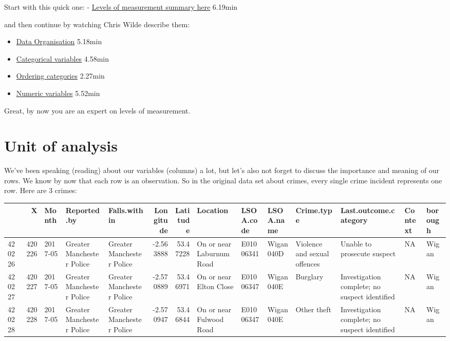 \documentclass[]{book}
\providecommand{\tightlist}{%
  \setlength{\itemsep}{0pt}\setlength{\parskip}{0pt}}
\theoremstyle{definition}
\theoremstyle{definition}
\theoremstyle{definition}
\theoremstyle{remark}
\begin{document}
Start with this quick one: -
\href{https://www.youtube.com/watch?v=hZxnzfnt5v8}{Levels of measurement
summary here} 6.19min

and then continue by watching Chris Wilde describe them:

\begin{itemize}
\tightlist
\item
  \href{https://www.youtube.com/watch?v=_ROBwTFVldo\&list=PL8CRAVedURQpYNoFt7w6maxaQCn3ZLytu\&index=3}{Data
  Organisation} 5.18min
\item
  \href{https://www.youtube.com/watch?v=38oQwFeCEag\&list=PL8CRAVedURQrlxeFfme0TEgaj1_h67JUR\&index=2}{Categorical
  variables} 4.58min
\item
  \href{https://www.youtube.com/watch?v=xmRuRRHsUeg\&index=3\&list=PL8CRAVedURQrlxeFfme0TEgaj1_h67JUR}{Ordering
  categories} 2.27min
\item
  \href{https://www.youtube.com/watch?v=U3lk2nQYfAQ\&list=PL8CRAVedURQrlxeFfme0TEgaj1_h67JUR\&index=4}{Numeric
  variables} 5.52min
\end{itemize}

Great, by now you are an expert on levels of measurement.

\hypertarget{unit-of-analysis}{%
\section{Unit of analysis}\label{unit-of-analysis}}

We've been speaking (reading) about our variables (columns) a lot, but
let's also not forget to discuss the importance and meaning of our rows.
We know by now that each row is an observation. So in the original data
set about crimes, every single crime incident represents one row. Here
are 3 crimes:

\begin{tabular}{l|r|l|l|l|r|r|l|l|l|l|l|l|l}
\hline
  & X & Month & Reported.by & Falls.within & Longitude & Latitude & Location & LSOA.code & LSOA.name & Crime.type & Last.outcome.category & Context & borough\\
\hline
420226 & 420226 & 2017-05 & Greater Manchester Police & Greater Manchester Police & -2.563888 & 53.47228 & On or near Laburnum Road & E01006341 & Wigan 040D & Violence and sexual offences & Unable to prosecute suspect & NA & Wigan\\
\hline
420227 & 420227 & 2017-05 & Greater Manchester Police & Greater Manchester Police & -2.570889 & 53.46971 & On or near Elton Close & E01006347 & Wigan 040E & Burglary & Investigation complete; no suspect identified & NA & Wigan\\
\hline
420228 & 420228 & 2017-05 & Greater Manchester Police & Greater Manchester Police & -2.570947 & 53.46844 & On or near Fulwood Road & E01006347 & Wigan 040E & Other theft & Investigation complete; no suspect identified & NA & Wigan\\
\hline
\end{tabular}
\end{document}

